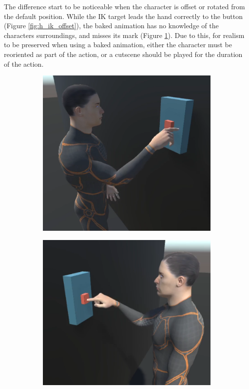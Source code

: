 The difference start to be noticeable when the character is offset or rotated
from the default position. While the IK target leads the hand correctly to the
button (Figure \ref{fig:h_ik_offset}), the baked animation has no knowledge of
the characters surroundings, and misses its mark (Figure \ref{fig:h_b_offset}).
Due to this, for realism to be preserved when using a baked animation, either
the character must be reoriented as part of the action, or a cutscene should be
played for the duration of the action. 

\begin{figure}[h!]
    \centering
    \captionsetup{justification=centering}
    \begin{subfigure}{0.4\textwidth}
        \includegraphics[width=\linewidth]{grafika/h_b_offset.png}
        \label{fig:h_b_offset}
    \end{subfigure}
    \begin{subfigure}{0.4\textwidth}
        \includegraphics[width=\linewidth]{grafika/h_ik_offset.png}

\end{subfigure}
\end{figure}
